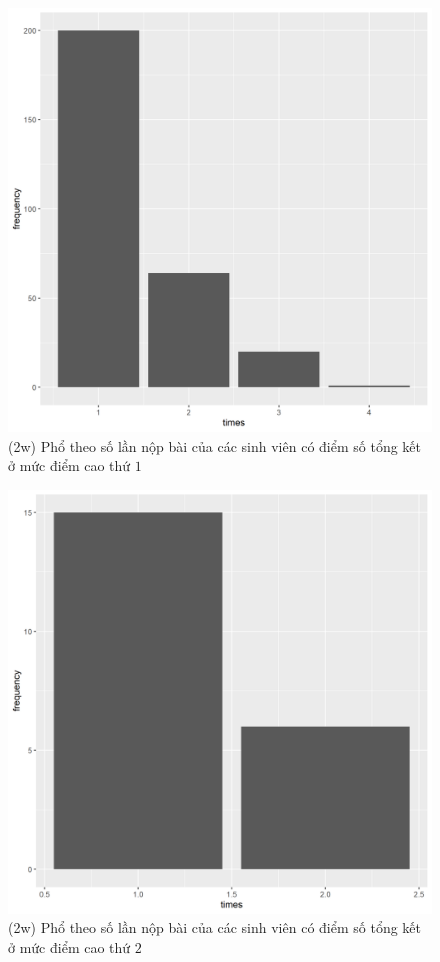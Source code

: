 \documentclass[a4paper]{article}
\theoremstyle{definition}
\begin{document}
\begin{figure}[!ht]
    \centering
    \includegraphics[scale=0.4]{Pics/q2w-1-file1.PNG}
    \caption{(2w) Phổ theo số lần nộp bài của các sinh viên có điểm số tổng kết ở mức điểm cao thứ $1$}
    \label{fig:my_label}
\end{figure}
\begin{figure}[!ht]
    \centering
    \includegraphics[scale=0.4]{Pics/q2w-2-file1.PNG}
    \caption{(2w) Phổ theo số lần nộp bài của các sinh viên có điểm số tổng kết ở mức điểm cao thứ $2$}
    \label{fig:my_label}
\end{figure}
\end{document}
